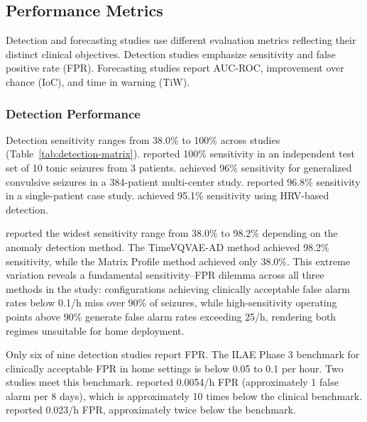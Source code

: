 \subsection{Performance Metrics}

Detection and forecasting studies use different evaluation metrics reflecting their distinct clinical objectives. Detection studies emphasize sensitivity and false positive rate (FPR). Forecasting studies report AUC-ROC, improvement over chance (IoC), and time in warning (TiW).

\subsubsection{Detection Performance}

Detection sensitivity ranges from 38.0\% to 100\% across studies (Table~\ref{tab:detection-matrix}). \textcite{fineDetectionKeyAutomated2025} reported 100\% sensitivity in an independent test set of 10 tonic seizures from 3 patients. \textcite{spahrDeepLearningbasedDetection2025} achieved 96\% sensitivity for generalized convulsive seizures in a 384-patient multi-center study. \textcite{singhrathoreDevelopmentMultimodalMachine2024} reported 96.8\% sensitivity in a single-patient case study. \textcite{elemamAutomatedValidatedTool2025} achieved 95.1\% sensitivity using HRV-based detection.

\textcite{reintjesECGBasedDetectionEpileptic2025} reported the widest sensitivity range from 38.0\% to 98.2\% depending on the anomaly detection method. The TimeVQVAE-AD method achieved 98.2\% sensitivity, while the Matrix Profile method achieved only 38.0\%. This extreme variation reveals a fundamental sensitivity--FPR dilemma across all three methods in the study: configurations achieving clinically acceptable false alarm rates below 0.1/h miss over 90\% of seizures, while high-sensitivity operating points above 90\% generate false alarm rates exceeding 25/h, rendering both regimes unsuitable for home deployment.

Only six of nine detection studies report FPR. The ILAE Phase 3 benchmark for clinically acceptable FPR in home settings is below 0.05 to 0.1 per hour. Two studies meet this benchmark. \textcite{spahrDeepLearningbasedDetection2025} reported 0.0054/h FPR (approximately 1 false alarm per 8 days), which is approximately 10 times below the clinical benchmark. \textcite{fineDetectionKeyAutomated2025} reported 0.023/h FPR, approximately twice below the benchmark.

